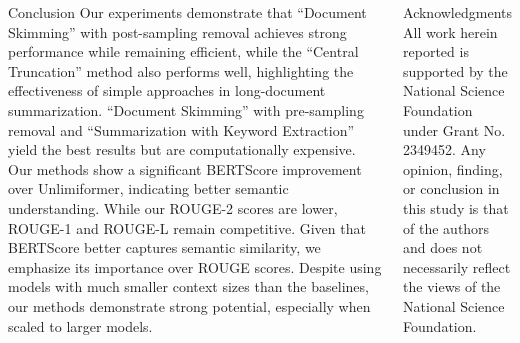 \documentclass[20pt]{beamer}
\begin{document}
\begin{frame}[t]
\begin{columns}[t]
  \begin{block}{Conclusion}
    Our experiments demonstrate that “Document Skimming” with post-sampling removal achieves strong performance while remaining efficient, while the “Central Truncation” method also performs well, highlighting the effectiveness of simple approaches in long-document summarization.
    “Document Skimming” with pre-sampling removal and “Summarization with Keyword Extraction” yield the best results but are computationally expensive.
    Our methods show a significant BERTScore improvement over Unlimiformer, indicating better semantic understanding.
    While our ROUGE-2 scores are lower, ROUGE-1 and ROUGE-L remain competitive.
    Given that BERTScore better captures semantic similarity, we emphasize its importance over ROUGE scores.
    Despite using models with much smaller context sizes than the baselines, our methods demonstrate strong potential, especially when scaled to larger models.
  \end{block}

  \begin{block}{Acknowledgments}
    All work herein reported is supported by the National Science Foundation under Grant No. 2349452.
    Any opinion, finding, or conclusion in this study is that of the authors and does not necessarily reflect the views of the National Science Foundation.
  \end{block}
\end{columns}

\end{frame}
\end{document}
